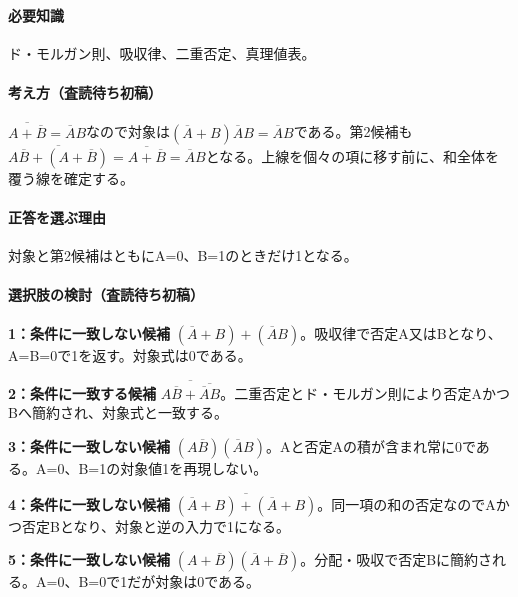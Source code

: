 \paragraph{必要知識} ド・モルガン則、吸収律、二重否定、真理値表。

\paragraph{考え方（査読待ち初稿）} \(\overline{A+\overline B}=\overline A B\)なので対象は\((\overline A+B)\overline A B=\overline A B\)である。第2候補も\(\overline{A\overline B+(A+\overline B)}=\overline{A+\overline B}=\overline A B\)となる。上線を個々の項に移す前に、和全体を覆う線を確定する。

\paragraph{正答を選ぶ理由} 対象と第2候補はともにA=\allowbreak{}0、B=\allowbreak{}1のときだけ1となる。

\paragraph{選択肢の検討（査読待ち初稿）}\mbox{}\par

\noindent\textbf{1：条件に一致しない候補} \((\overline A+B)+(\overline A B)\)。吸収律で否定A又はBとなり、A=\allowbreak{}B=\allowbreak{}0で1を返す。対象式は0である。\par

\noindent\textbf{2：条件に一致する候補} \(\overline{A\overline B+\overline{\overline A B}}\)。二重否定とド・モルガン則により否定AかつBへ簡約され、対象式と一致する。\par

\noindent\textbf{3：条件に一致しない候補} \((A\overline B)(\overline A B)\)。Aと否定Aの積が含まれ常に0である。A=\allowbreak{}0、B=\allowbreak{}1の対象値1を再現しない。\par

\noindent\textbf{4：条件に一致しない候補} \(\overline{(\overline A+B)+(\overline A+B)}\)。同一項の和の否定なのでAかつ否定Bとなり、対象と逆の入力で1になる。\par

\noindent\textbf{5：条件に一致しない候補} \((A+\overline B)(\overline A+\overline B)\)。分配・吸収で否定Bに簡約される。A=\allowbreak{}0、B=\allowbreak{}0で1だが対象は0である。\par

